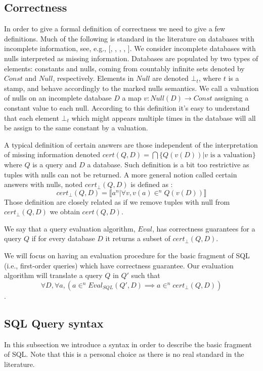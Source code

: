 \subsection{Correctness}

In order to give a formal definition of correctness we need to give a few definitions. Much of the following is standard in the literature on databases with incomplete information, see, e.g., [\cite{abiteboul1995foundations}, \cite{van1998logical}, \cite{gheerbrant2014naive}, \cite{libkin2016sql}, \cite{imielinski1984incomplete}].
We consider incomplete databases with nulls interpreted as missing information. 
Databases are populated by two types of elements: constants and nulls, coming from countably infinite sets denoted by $Const$ and $Null$, respectively. Elements in $Null$ are denoted $\bot_t$, where $t$ is a stamp, and behave accordingly to the marked nulls semantics.
We call a valuation of nulls on an incomplete database $D$ a map
$v : Null(D) \rightarrow Const$ assigning a constant value to each null.
According to this definition it's easy to understand that each element $\bot_t$ which might appears multiple times in the database will all be assign to the same constant by a valuation. 

A typical definition of certain answers are those independent of the interpretation of missing information denoted $cert(Q,D) = \bigcap \{ Q(v(D)) | v \mbox{ is a valuation} \} $ where $Q$ is a query and $D$ a database. Such definition is a bit too restrictive as tuples with nulls can not be returned. A more general notion called certain answers with nulls, noted $cert_\bot(Q,D)$ is defined as : 
$$cert_\bot(Q,D) = \llbracket a^n | \forall v, v(a) \in^n Q(v(D)) \rrbracket$$
Those definition are closely related as if we remove tuples with null from $cert_\bot(Q,D)$ we obtain $cert(Q,D)$.

We say that a query evaluation algorithm, $Eval$, has correctness guarantees for a query $Q$ if for every database $D$ it returns a subset of $cert_\bot(Q, D)$.

We will focus on having an evaluation procedure for the basic fragment of SQL (i.e., first-order queries) which have correctness guarantee. Our evaluation algorithm will translate a query $Q$ in $Q'$ such that $$\forall D, \forall a , (a \in^n Eval_{SQL}(Q',D) \implies a \in^n cert_\bot(Q,D))$$. 

\subsection{SQL Query syntax}
\label{semantic}
In this subsection we  introduce a syntax in order to describe the basic fragment of SQL. 
Note that this is a personal choice as there is no real standard in the literature.   

